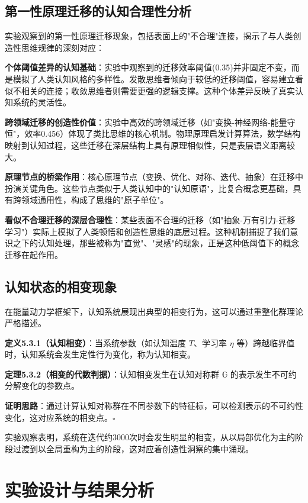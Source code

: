 \documentclass[12pt,a4paper]{article}
\newcommand{\cognitivegroup}{\mathbb{G}}
\begin{document}
\subsection{第一性原理迁移的认知合理性分析}

实验观察到的第一性原理迁移现象，包括表面上的"不合理"连接，揭示了与人类创造性思维规律的深刻对应：

\textbf{个体阈值差异的认知基础}：实验中观察到的迁移效率阈值(0.35)并非固定不变，而是模拟了人类认知风格的多样性。发散思维者倾向于较低的迁移阈值，容易建立看似不相关的连接；收敛思维者则需要更强的逻辑支撑。这种个体差异反映了真实认知系统的灵活性。

\textbf{跨领域迁移的创造性价值}：实验中高效的跨领域迁移（如"变换-神经网络-能量守恒"，效率0.456）体现了类比思维的核心机制。物理原理启发计算算法，数学结构映射到认知过程，这些迁移在深层结构上具有原理相似性，只是表层语义距离较大。

\textbf{原理节点的桥梁作用}：核心原理节点（变换、优化、对称、迭代、抽象）在迁移中扮演关键角色。这些节点类似于人类认知中的"认知原语"，比复合概念更基础，具有跨领域通用性，构成了思维的"原子单位"。

\textbf{看似不合理迁移的深层合理性}：某些表面不合理的迁移（如"抽象-万有引力-迁移学习"）实际上模拟了人类顿悟和创造性思维的底层过程。这种机制捕捉了我们意识之下的认知处理，那些被称为"直觉"、"灵感"的现象，正是这种低阈值下的概念迁移在起作用。

\subsection{认知状态的相变现象}

在能量动力学框架下，认知系统展现出典型的相变行为，这可以通过重整化群理论严格描述。

\textbf{定义5.3.1（认知相变）}：当系统参数（如认知温度 $T$、学习率 $\eta$ 等）跨越临界值时，认知系统会发生定性行为变化，称为认知相变。

\textbf{定理5.3.2（相变的代数判据）}：认知相变发生在认知对称群 $\cognitivegroup$ 的表示发生不可约分解变化的参数点。

\textbf{证明思路}：通过计算认知对称群在不同参数下的特征标，可以检测表示的不可约性变化，这对应系统的相变点。$\square$

实验观察表明，系统在迭代约3000次时会发生明显的相变，从以局部优化为主的阶段过渡到以全局重构为主的阶段，这对应着创造性洞察的集中涌现。

\section{实验设计与结果分析}
\end{document}
